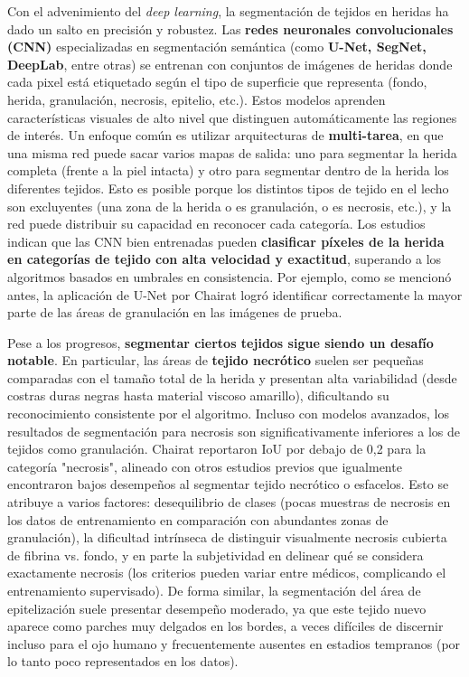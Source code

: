 Con el advenimiento del \textit{deep learning}, la segmentación de tejidos en heridas ha dado un salto en precisión y robustez. Las \textbf{redes neuronales convolucionales (CNN)} especializadas en segmentación semántica (como \textbf{U-Net, SegNet, DeepLab}, entre otras) se entrenan con conjuntos de imágenes de heridas donde cada pixel está etiquetado según el tipo de superficie que representa (fondo, herida, granulación, necrosis, epitelio, etc.). Estos modelos aprenden características visuales de alto nivel que distinguen automáticamente las regiones de interés. Un enfoque común es utilizar arquitecturas de \textbf{multi-tarea}, en que una misma red puede sacar varios mapas de salida: uno para segmentar la herida completa (frente a la piel intacta) y otro para segmentar dentro de la herida los diferentes tejidos. Esto es posible porque los distintos tipos de tejido en el lecho son excluyentes (una zona de la herida o es granulación, o es necrosis, etc.), y la red puede distribuir su capacidad en reconocer cada categoría. Los estudios indican que las CNN bien entrenadas pueden \textbf{clasificar píxeles de la herida en categorías de tejido con alta velocidad y exactitud}, superando a los algoritmos basados en umbrales en consistencia. Por ejemplo, como se mencionó antes, la aplicación de U-Net por Chairat  logró identificar correctamente la mayor parte de las áreas de granulación en las imágenes de prueba.

Pese a los progresos, \textbf{segmentar ciertos tejidos sigue siendo un desafío notable}. En particular, las áreas de \textbf{tejido necrótico} suelen ser pequeñas comparadas con el tamaño total de la herida y presentan alta variabilidad (desde costras duras negras hasta material viscoso amarillo), dificultando su reconocimiento consistente por el algoritmo. Incluso con modelos avanzados, los resultados de segmentación para necrosis son significativamente inferiores a los de tejidos como granulación. Chairat  reportaron IoU por debajo de 0,2 para la categoría "necrosis", alineado con otros estudios previos que igualmente encontraron bajos desempeños al segmentar tejido necrótico o esfacelos. Esto se atribuye a varios factores: desequilibrio de clases (pocas muestras de necrosis en los datos de entrenamiento en comparación con abundantes zonas de granulación), la dificultad intrínseca de distinguir visualmente necrosis cubierta de fibrina vs. fondo, y en parte la subjetividad en delinear qué se considera exactamente necrosis (los criterios pueden variar entre médicos, complicando el entrenamiento supervisado). De forma similar, la segmentación del área de epitelización suele presentar desempeño moderado, ya que este tejido nuevo aparece como parches muy delgados en los bordes, a veces difíciles de discernir incluso para el ojo humano y frecuentemente ausentes en estadios tempranos (por lo tanto poco representados en los datos). 


